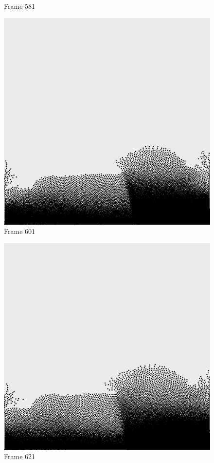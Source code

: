 \documentclass[a4paper, 12pt, oneside]{book}
\begin{document}
\begin{figure}[!ht]
\begin{center}
            Frame 581
        \end{center}
    \endminipage
    \hfill
        \begin{center}
            \includegraphics[width=\linewidth]{images/test_case_2/601.png}
            Frame 601
        \end{center}
    \endminipage
    \hfill
        \begin{center}
            \includegraphics[width=\linewidth]{images/test_case_2/621.png}
            Frame 621
        \end{center}
    \endminipage
    \hfill


\end{figure}
\end{document}
